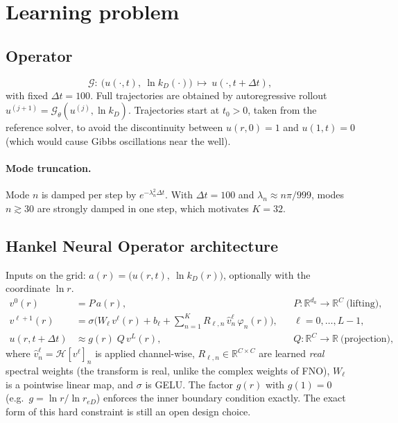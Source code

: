\documentclass[11pt]{article}
\newcommand{\reD}{r_{eD}}
\begin{document}
\section{Learning problem}

\subsection{Operator}
\begin{equation}
  \mathcal{G}:\ \big(u(\cdot,t),\ \ln k_D(\cdot)\big)\ \longmapsto\ u(\cdot,t+\Delta t),
\end{equation}
with fixed $\Delta t = 100$. Full trajectories are obtained by autoregressive rollout
$u^{(j+1)} = \mathcal{G}_\theta(u^{(j)},\ln k_D)$.
Trajectories start at $t_0>0$, taken from the reference solver, to avoid the discontinuity between $u(r,0)=1$ and $u(1,t)=0$
(which would cause Gibbs oscillations near the well).

\paragraph{Mode truncation.} Mode $n$ is damped per step by $e^{-\lambda_n^2\Delta t}$. With $\Delta t=100$ and
$\lambda_n\approx n\pi/999$, modes $n\gtrsim 30$ are strongly damped in one step, which motivates $K=32$.

\subsection{Hankel Neural Operator architecture}
Inputs on the grid: $a(r) = \big(u(r,t),\ \ln k_D(r)\big)$, optionally with the coordinate $\ln r$.
\begin{align}
  v^{0}(r) &= P\,a(r), && P:\mathbb{R}^{d_a}\to\mathbb{R}^{C}\ \text{(lifting)},\\
  v^{\ell+1}(r) &= \sigma\!\Big( W_\ell\, v^{\ell}(r) + b_\ell + \sum_{n=1}^{K} R_{\ell,n}\,\hat v^{\ell}_n\,\varphi_n(r) \Big),
  && \ell=0,\dots,L-1,\\
  u(r,t+\Delta t) &\approx g(r)\; Q\,v^{L}(r), && Q:\mathbb{R}^{C}\to\mathbb{R}\ \text{(projection)},
\end{align}
where $\hat v^\ell_n = \mathcal{H}[v^\ell]_n$ is applied channel-wise, $R_{\ell,n}\in\mathbb{R}^{C\times C}$ are learned
\emph{real} spectral weights (the transform is real, unlike the complex weights of FNO), $W_\ell$ is a pointwise
linear map, and $\sigma$ is GELU. The factor $g(r)$ with $g(1)=0$ (e.g.\ $g=\ln r/\ln\reD$) enforces the inner
boundary condition exactly. The exact form of this hard constraint is still an open design choice.
\end{document}
